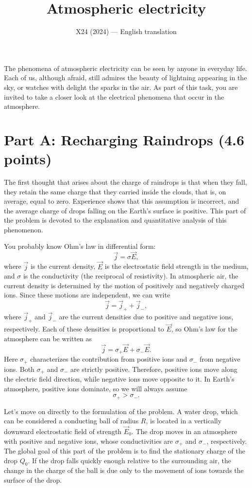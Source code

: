 \documentclass[11pt,a4paper]{article}
\title{\textbf{Atmospheric electricity}}
\author{\normalsize X24 (2024) --- English translation}
\date{}
\begin{document}
\maketitle

The phenomena of atmospheric electricity can be seen by anyone in everyday life. Each of us, although afraid, still admires the beauty of lightning appearing in the sky, or watches with delight the sparks in the air. As part of this task, you are invited to take a closer look at the electrical phenomena that occur in the atmosphere.

\section*{Part A: Recharging Raindrops (4.6 points)}

The first thought that arises about the charge of raindrops is that when they fall, they retain the same charge that they carried inside the clouds, that is, on average, equal to zero. Experience shows that this assumption is incorrect, and the average charge of drops falling on the Earth’s surface is positive. This part of the problem is devoted to the explanation and quantitative analysis of this phenomenon.

You probably know Ohm's law in differential form:
$$\vec{j}=\sigma\vec{E},$$
where $\vec{j}$ is the current density, $\vec{E}$ is the electrostatic field strength in the medium, and $\sigma$ is the conductivity (the reciprocal of resistivity). In atmospheric air, the current density is determined by the motion of positively and negatively charged ions. Since these motions are independent, we can write
$$\vec{j}=\vec{j}_+ + \vec{j}_-,$$
where $\vec{j}_+$ and $\vec{j}_-$ are the current densities due to positive and negative ions, respectively. Each of these densities is proportional to $\vec{E}$, so Ohm's law for the atmosphere can be written as
$$\vec{j}=\sigma_+\vec{E}+\sigma_-\vec{E}.$$
Here $\sigma_+$ characterizes the contribution from positive ions and $\sigma_-$ from negative ions. Both $\sigma_+$ and $\sigma_-$ are strictly positive. Therefore, positive ions move along the electric field direction, while negative ions move opposite to it. In Earth's atmosphere, positive ions dominate, so we will always assume
$$\sigma_+>\sigma_-.$$

Let's move on directly to the formulation of the problem. A water drop, which can be considered a conducting ball of radius $R$, is located in a vertically downward electrostatic field of strength $\vec{E}_0$. The drop moves in an atmosphere with positive and negative ions, whose conductivities are $\sigma_+$ and $\sigma_-$, respectively. The global goal of this part of the problem is to find the stationary charge of the drop $Q_0$. If the drop falls quickly enough relative to the surrounding air, the change in the charge of the ball is due only to the movement of ions towards the surface of the drop.
\end{document}
